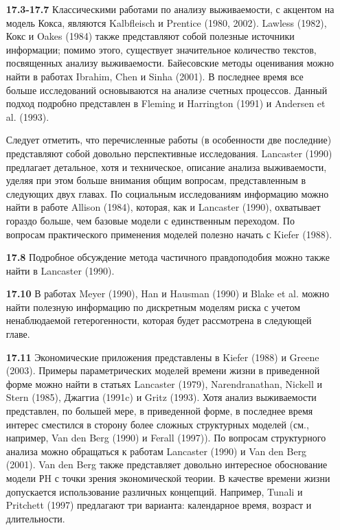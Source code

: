 \begin{itemize}

    \item[\textbf{17.3-17.7}]
Классическими работами по анализу выживаемости, с акцентом на модель Кокса, являются Kalbfleisch и Prentice (1980, 2002). Lawless (1982), Кокс и Oakes (1984) также представляют собой полезные источники информации; помимо этого, существует значительное количество текстов, посвященных анализу выживаемости. Байесовские методы оценивания можно найти в работах Ibrahim, Chen и Sinha (2001). В последнее время все больше исследований основываются на анализе счетных процессов. Данный подход подробно представлен в Fleming и Harrington (1991) и Andersen et al. (1993).

Следует отметить, что перечисленные работы (в особенности две последние) представляют собой довольно перспективные исследования. Lancaster (1990) предлагает детальное, хотя и техническое, описание анализа выживаемости, уделяя при этом больше внимания общим вопросам, представленным в следующих двух главах. По социальным исследованиям информацию можно найти в работе Allison (1984), которая, как и Lancaster (1990), охватывает гораздо больше, чем базовые модели с единственным переходом. По вопросам практического применения моделей полезно начать с Kiefer (1988).

    \item[\textbf{17.8}]
Подробное обсуждение метода частичного правдоподобия можно также найти в Lancaster (1990).

    \item[\textbf{17.10}]
В работах Meyer (1990), Han и Hausman (1990) и Blake et al. можно найти полезную информацию по дискретным моделям риска с учетом ненаблюдаемой гетерогенности, которая будет рассмотрена в следующей главе.

    \item[\textbf{17.11}]
Экономические приложения представлены в Kiefer (1988) и Greene (2003). Примеры параметрических моделей времени жизни в приведенной форме можно найти в статьях Lancaster (1979), Narendranathan, Nickell и Stern (1985), Джаггиа (1991c) и Gritz (1993). Хотя анализ выживаемости представлен, по большей мере, в приведенной форме, в последнее время интерес сместился в сторону более сложных структурных моделей (см., например, Van den Berg (1990) и Ferall (1997)). По вопросам структурного анализа можно обращаться к работам Lancaster (1990) и Van den Berg (2001). Van den Berg также представляет довольно интересное обоснование модели РH с точки зрения экономической теории. В качестве времени жизни допускается использование различных концепций. Например, Tunali и Pritchett (1997) предлагают три варианта: календарное время, возраст и длительности.
\end{itemize}


